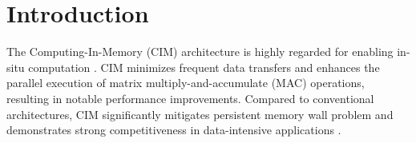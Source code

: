 \section{Introduction}
The Computing-In-Memory (CIM) architecture is highly regarded for enabling in-situ computation \cite{chen2020survey,ankit2019puma,biswas2018conv,eckert2018neural,song2017pipelayer,chi2016prime,shafiee2016isaac}. CIM minimizes frequent data transfers and enhances the parallel execution of matrix multiply-and-accumulate (MAC) operations, resulting in notable performance improvements. Compared to conventional architectures, CIM significantly mitigates persistent memory wall problem \cite{wulf1995hitting} and demonstrates strong competitiveness in data-intensive applications  \cite{yang2020retransformer,shafiee2016isaac,sridharan2023x}.


